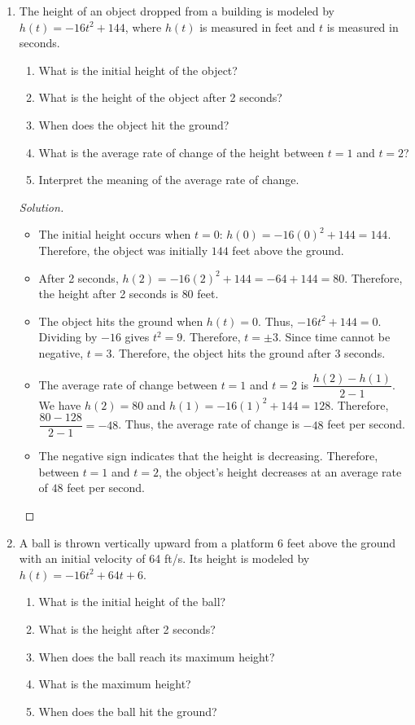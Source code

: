 \documentclass[12pt]{article}
\newenvironment{solution}{\begin{proof}[Solution]}{\end{proof}}
\begin{document}
\begin{enumerate}
		\item The height of an object dropped from a building is modeled by $h(t)=-16t^2+144$, where $h(t)$ is measured in feet and $t$ is measured in seconds.
		
		\begin{enumerate}
			\item What is the initial height of the object?
			\item What is the height of the object after 2 seconds?
			\item When does the object hit the ground?
			\item What is the average rate of change of the height between $t=1$ and $t=2$?
			\item Interpret the meaning of the average rate of change.
		\end{enumerate}
		
		\begin{solution}
			\begin{itemize}
				\item[(a)] The initial height occurs when $t=0$: $ h(0)=-16(0)^2+144=144$. Therefore, the object was initially $144$ feet above the ground. 
				\item[(b)] After 2 seconds, $h(2)=-16(2)^2+144 =-64+144 = 80$. Therefore, the height after 2 seconds is $80$ feet. 
				\item[(c)] The object hits the ground when $h(t)=0$. Thus, $-16t^2+144=0$. Dividing by $-16$ gives $t^2=9.$ Therefore, $t=\pm3$. Since time cannot be negative, $t=3$. Therefore, the object hits the ground after $3$ seconds. 
				\item[(d)] The average rate of change between $t=1$ and $t=2$ is $\dfrac{h(2)-h(1)}{2-1}$. We have $h(2)=80$ and $h(1)=-16(1)^2+144=128$. Therefore, $\dfrac{80-128}{2-1}=-48$. Thus, the average rate of change is $-48$ feet per second. 
				\item[(e)] The negative sign indicates that the height is decreasing. Therefore, between $t=1$ and $t=2$, the object's height decreases at an average rate of $48$ feet per second.
			\end{itemize}
		\end{solution}
		
		\item A ball is thrown vertically upward from a platform 6 feet above the ground with an initial velocity of 64 ft/s. Its height is modeled by $h(t)=-16t^2+64t+6$.
		
		\begin{enumerate}
			\item What is the initial height of the ball?
			\item What is the height after 2 seconds?
			\item When does the ball reach its maximum height?
			\item What is the maximum height?
			\item When does the ball hit the ground?
		\end{enumerate}
		

\end{enumerate}
\end{document}
